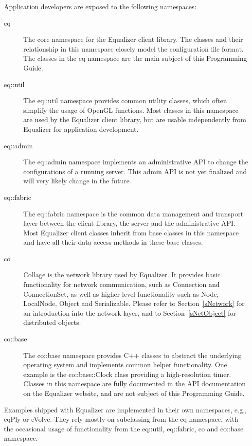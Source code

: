 \documentclass[10pt,a4]{scrartcl}
\newcommand{\sref}[1]{Section~\ref{#1}}
\begin{document}
Application developers are exposed to the following namespaces:

\begin{description}
\item[eq] The core namespace for the Equalizer client library. The
  classes and their relationship in this namespace closely model the
  configuration file format. The classes in the \textsf{eq} namespace
  are the main subject of this Programming Guide.
\item[eq::util] The eq::util namespace provides common utility classes, which
  often simplify the usage of OpenGL functions. Most classes in this namespace
  are used by the Equalizer client library, but are usable independently
  from Equalizer for application development.
\item[eq::admin] The eq::admin namespace implements an administrative API to
  change the configurations of a running server. This admin API is not yet
  finalized and will very likely change in the future.
\item[eq::fabric] The eq::fabric namespace is the common data management and
  transport layer between the client library, the server and the administrative
  API. Most Equalizer client classes inherit from base classes in this namespace
  and have all their data access methods in these base classes.
\item[co] Collage is the network library used by Equalizer. It provides basic
  functionality for network communication, such as \textsf{Connection} and
  \textsf{ConnectionSet}, as well as higher-level functionality such as
  \textsf{Node}, \textsf{LocalNode}, \textsf{Object} and
  \textsf{Serializable}. Please refer to \sref{sNetwork} for an introduction
  into the network layer, and to \sref{sNetObject} for distributed objects.
\item[co::base] The co::base namespace provides C++ classes to abstract
  the underlying operating system and implements common helper
  functionality. One example is the \textsf{co::base::Clock} class
  providing a high-resolution timer. Classes in this namespace are fully
  documented in the API documentation on the Equalizer website, and are
  not subject of this Programming Guide.
\end{description}

Examples shipped with Equalizer are implemented in their own namespaces, e.g.,
\textsf{eqPly} or \textsf{eVolve}. They rely mostly on subclassing from the
\textsf{eq} namespace, with the occasional usage of functionality from the
\textsf{eq::util}, \textsf{eq::fabric}, \textsf{co} and \textsf{co::base}
namespace.
\end{document}
